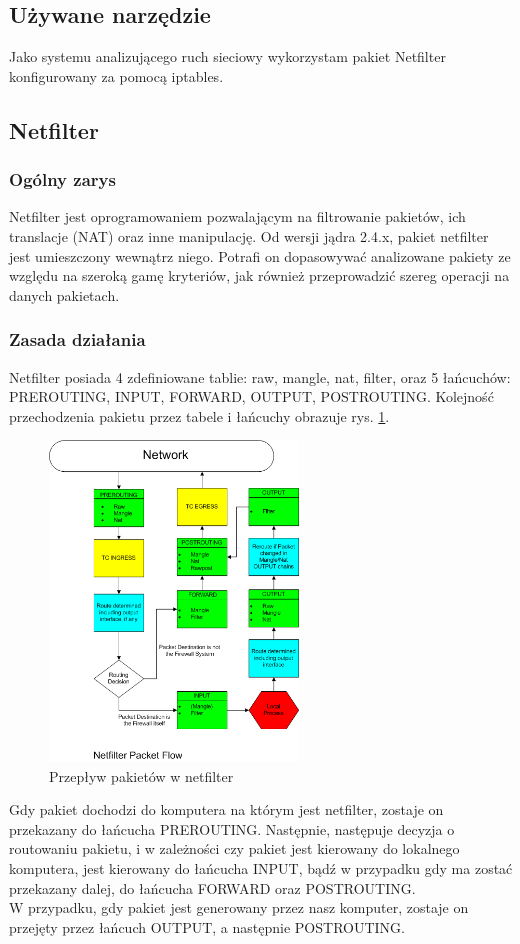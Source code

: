 \documentclass[a4paper,10pt,twoside]{book}
\begin{document}
		\subsection{Używane narzędzie}
			Jako systemu analizującego ruch sieciowy wykorzystam pakiet Netfilter konfigurowany za pomocą iptables.
		\subsection{Netfilter}
			\subsubsection{Ogólny zarys}
				Netfilter jest oprogramowaniem pozwalającym na filtrowanie pakietów, ich translacje (NAT) oraz inne manipulację.
				Od wersji jądra 2.4.x, pakiet netfilter jest umieszczony wewnątrz niego.
				Potrafi on dopasowywać analizowane pakiety ze względu na szeroką gamę kryteriów, jak również przeprowadzić szereg operacji na danych pakietach.
			\subsubsection{Zasada działania}
				Netfilter posiada 4 zdefiniowane tablie: raw, mangle, nat, filter, oraz 5 łańcuchów: PREROUTING, INPUT, FORWARD, OUTPUT, POSTROUTING.
				Kolejność przechodzenia pakietu przez tabele i łańcuchy obrazuje rys. \ref{fig:flowchart}.\\
				\begin{figure}[h]
					\centering
						\includegraphics[width=250px]{Netfilter.png}
						\caption{Przepływ pakietów w netfilter}
						\label{fig:flowchart}
				\end{figure}
				Gdy pakiet dochodzi do komputera na którym jest netfilter, zostaje on przekazany do łańcucha PREROUTING. Następnie, następuje decyzja o routowaniu pakietu, i w zależności czy pakiet jest kierowany do lokalnego komputera, jest kierowany do łańcucha INPUT, bądź w przypadku gdy ma zostać przekazany dalej, do łańcucha FORWARD oraz POSTROUTING.\\
				W przypadku, gdy pakiet jest generowany przez nasz komputer, zostaje on przejęty przez łańcuch OUTPUT, a następnie POSTROUTING.
\end{document}
